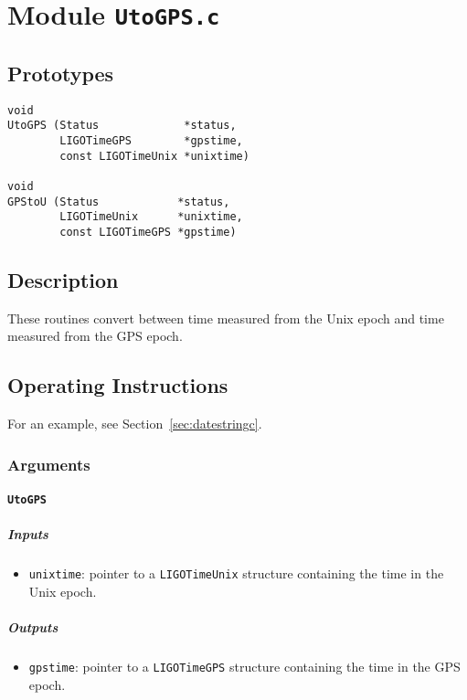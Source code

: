 
\section{Module \texttt{UtoGPS.c}}

\subsection{Prototypes}
\begin{verbatim}
void
UtoGPS (Status             *status,
        LIGOTimeGPS        *gpstime,
        const LIGOTimeUnix *unixtime)

void
GPStoU (Status            *status,
        LIGOTimeUnix      *unixtime,
        const LIGOTimeGPS *gpstime)
\end{verbatim}

\subsection{Description}

These routines convert between time measured from the Unix epoch and time
measured from the GPS epoch.

\subsection{Operating Instructions}
For an example, see Section~\ref{sec:datestringc}.

\subsubsection{Arguments}

\paragraph{\texttt{UtoGPS}}

\subparagraph{Inputs}

\begin{itemize}
    \item \texttt{unixtime}: pointer to a \texttt{LIGOTimeUnix} structure
      containing the time in the Unix epoch.
\end{itemize}

\subparagraph{Outputs}

\begin{itemize}
  \item \texttt{gpstime}: pointer to a \texttt{LIGOTimeGPS} structure containing
    the time in the GPS epoch.
\end{itemize}

